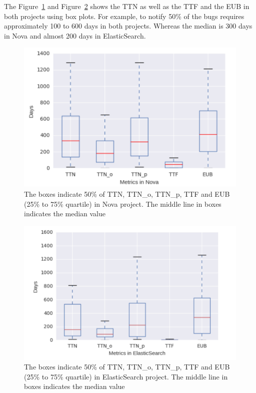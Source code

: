 \documentclass[10pt, conference]{IEEEtran}
\begin{document}
The Figure~\ref{fig:meansOfNova} and Figure~\ref{fig:meansOfES} shows the TTN as well as the TTF and the EUB in both projects using box plots. For example, to notify 50\% of the bugs requires approximately 100 to 600 days in both projects. Whereas the median is 300 days in Nova and almost 200 days in ElasticSearch.  

\begin{figure}[ht]
\centering
\includegraphics[width=\columnwidth]{boxplotNova.png}
\caption{The boxes indicate 50\% of TTN, TTN\_o, TTN\_p, TTF and EUB (25\% to 75\% quartile) in Nova project. The middle line in boxes indicates the median value}
\label{fig:meansOfNova}       %
\end{figure}

\begin{figure}[ht]
\centering
\includegraphics[width=\columnwidth]{boxplotES.png}
\caption{The boxes indicate 50\% of TTN, TTN\_o, TTN\_p, TTF and EUB (25\% to 75\% quartile) in ElasticSearch project. The middle line in boxes indicates the median value}
\label{fig:meansOfES}       %
\end{figure}
\end{document}
